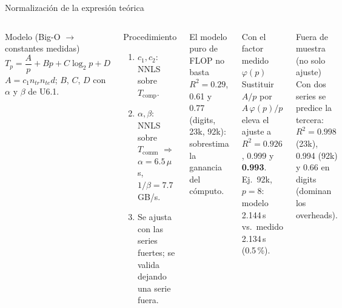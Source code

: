 \documentclass[aspectratio=169,10pt]{beamer}
\newcommand{\ntr}{n_{tr}}
\newcommand{\nte}{n_{te}}
\newcommand{\tsub}[1]{T_{\mathrm{#1}}}
\renewenvironment{block}[1]{\begin{caja}[cajagris]{#1}}{\end{caja}}
\renewenvironment{exampleblock}[1]{\begin{caja}[cajaverde]{#1}}{\end{caja}}
\renewenvironment{alertblock}[1]{\begin{caja}[cajaroja]{#1}}{\end{caja}}
\begin{document}
\begin{frame}{Normalización de la expresión teórica}
\begin{columns}[T]
\begin{block}{Modelo (Big-O $\to$ constantes medidas)}
\[
T_p=\frac{A}{p}+Bp+C\log_2p+D
\]
{\small $A=c_1\ntr\nte d$; $B$, $C$, $D$ con $\alpha$ y $\beta$ de U6.1.}
\end{block}
\begin{block}{Procedimiento}
\begin{enumerate}\setlength{\itemsep}{1pt}\small
\item $c_1,c_2$: NNLS sobre $\tsub{comp}$.
\item $\alpha,\beta$: NNLS sobre $\tsub{comm}$ $\Rightarrow$ $\alpha=6.5\,\mu$s, $1/\beta=7.7$\,GB/s.
\item Se ajusta con las series fuertes; se valida dejando una serie fuera.
\end{enumerate}
\end{block}
\begin{alertblock}{El modelo puro de FLOP no basta}
$R^2=0.29$, 0.61 y 0.77 (digits, 23k, 92k): sobrestima la ganancia del cómputo.
\end{alertblock}
\begin{exampleblock}{Con el factor medido $\varphi(p)$}
Sustituir $A/p$ por $A\,\varphi(p)/p$ eleva el ajuste a $R^2=0.926$, 0.999 y \textbf{0.993}.\\
{\small Ej.\ 92k, $p=8$: modelo 2.144\,s vs.\ medido 2.134\,s (0.5\,\%).}
\end{exampleblock}
\begin{block}{Fuera de muestra (no solo ajuste)}
\footnotesize Con dos series se predice la tercera: $R^2=0.998$ (23k), 0.994 (92k) y 0.66 en digits (dominan los overheads).
\end{block}
\end{columns}
\end{frame}
\end{document}
